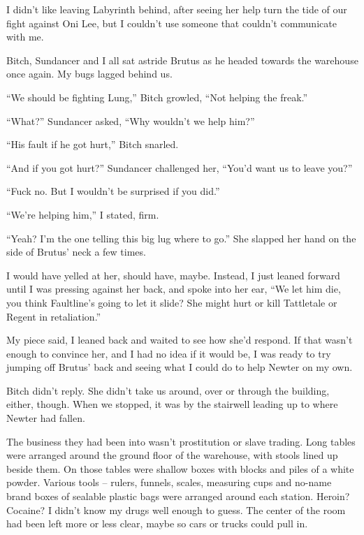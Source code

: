





I didn't like leaving Labyrinth behind, after seeing her help turn the tide of our fight against Oni Lee, but I couldn't use someone that couldn't communicate with me.



Bitch, Sundancer and I all sat astride Brutus as he headed towards the warehouse once again.  My bugs lagged behind us.



``We should be fighting Lung,'' Bitch growled, ``Not helping the freak.''



``What?'' Sundancer asked, ``Why wouldn't we help him?''



``His fault if he got hurt,'' Bitch snarled.



``And if you got hurt?'' Sundancer challenged her, ``You'd want us to leave you?''



``Fuck no.  But I wouldn't be surprised if you did.''



``We're helping him,'' I stated, firm.



``Yeah?  I'm the one telling this big lug where to go.''  She slapped her hand on the side of Brutus' neck a few times.



I would have yelled at her, should have, maybe.  Instead, I just leaned forward until I was pressing against her back, and spoke into her ear, ``We let him die, you think Faultline's going to let it slide?  She might hurt or kill Tattletale or Regent in retaliation.''



My piece said, I leaned back and waited to see how she'd respond.  If that wasn't enough to convince her, and I had no idea if it would be, I was ready to try jumping off Brutus' back and seeing what I could do to help Newter on my own.



Bitch didn't reply.  She didn't take us around, over or through the building, either, though.  When we stopped, it was by the stairwell leading up to where Newter had fallen.



The business they had been into wasn't prostitution or slave trading.  Long tables were arranged around the ground floor of the warehouse, with stools lined up beside them.  On those tables were shallow boxes with blocks and piles of a white powder.  Various tools – rulers, funnels, scales, measuring cups and no-name brand boxes of sealable plastic bags were arranged around each station.  Heroin?  Cocaine?  I didn't know my drugs well enough to guess.  The center of the room had been left more or less clear, maybe so cars or trucks could pull in.



